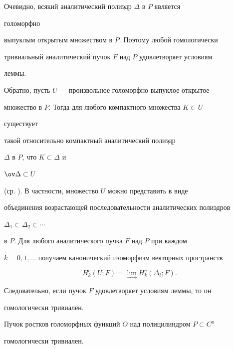 \begin{pf} 


Очевидно, всякий аналитический полиэдр $\Delta$ в $P$ является 


голоморфно 


выпуклым открытым множеством в $P$. Поэтому любой гомологически 


тривиальный аналитический пучок $F$ над $P$ удовлетворяет условиям 


леммы. 


Обратно, пусть $U$ --- произвольное голоморфно выпуклое открытое 


множество в $P$. Тогда для любого компактного множества $K\subset U$ 


существует 


такой относительно компактный аналитический полиэдр 


$\Delta$ в $P$, что $K\subset\Delta$ и 


$\ov\Delta\subset U$ 


(ср. \cite{3}). В частности, множество $U$ можно представить в виде 


объединения возрастающей последовательности аналитических полиэдров 


$\Delta_1\subset\Delta_2\subset\dotsb$ 


в $P$. Для любого аналитического пучка $F$ над $P$ при каждом 


$k=0,1,\dotsc$ получаем канонический изоморфизм векторных пространств 


$$ 


H^c_k(U;F)=\lim_{\to}H^c_k(\Delta_i;F). 


$$ 


Следовательно, если пучок $F$ удовлетворяет условиям леммы, то он 


гомологически тривиален. 


\end{pf} 


 


\begin{thm} 


Пучок ростков голоморфных функций $O$ над полицилиндром $P\subset C^n$ 


гомологически тривиален. 


\end{thm} 


 


